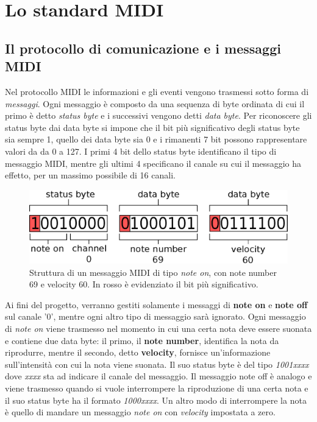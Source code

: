 \chapter{Lo standard MIDI}
\label{chap:midi}

\section{Il protocollo di comunicazione e i messaggi MIDI}
Nel protocollo MIDI\cite{midispec} le informazioni e gli eventi vengono trasmessi sotto forma di \textit{messaggi}.
Ogni messaggio è composto da una sequenza di byte ordinata di cui il primo è detto \textit{status byte} e i successivi
vengono detti \textit{data byte}.
Per riconoscere gli status byte dai data byte si impone che il bit più significativo degli status byte sia sempre 1, quello dei data byte sia 0 e
i rimanenti 7 bit possono rappresentare valori da da 0 a 127.
I primi 4 bit dello status byte identificano il tipo di messaggio MIDI, mentre gli ultimi 4 specificano il canale su cui il messaggio ha effetto,
per un massimo possibile di 16 canali.

\begin{figure}
    \centering
    \def\svgwidth{\columnwidth}
    \includegraphics[width=0.7\columnwidth]{TeX_files/midi_message.eps}
    \caption{Struttura di un messaggio MIDI di tipo \textit{note on},
    	     con note number 69 e velocity 60. In rosso è evidenziato
             il bit più significativo.}
\end{figure}

Ai fini del progetto, verranno gestiti solamente i messaggi di \textbf{note on} e \textbf{note off} sul canale '0', mentre
ogni altro tipo di messaggio sarà ignorato.
Ogni messaggio di \textit{note on} viene trasmesso nel momento in cui una certa nota deve essere suonata e contiene due data byte: 
il primo, il \textbf{note number}, identifica la nota da riprodurre, mentre il secondo, detto \textbf{velocity}, fornisce un'informazione
sull'intensità con cui la nota viene suonata. Il suo status byte è del tipo
\textit{1001xxxx} dove \textit{xxxx} sta ad indicare il canale del
messaggio.
Il messaggio note off è analogo e viene trasmesso quando si vuole
interrompere la riproduzione di una certa nota e il suo status byte
ha il formato \textit{1000xxxx}.
Un altro modo di interrompere la nota è quello di mandare
un messaggio \textit{note on} con \textit{velocity} impostata a zero.

